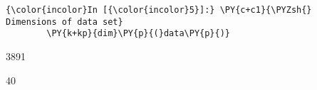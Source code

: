    \begin{Verbatim}[commandchars=\\\{\}]
{\color{incolor}In [{\color{incolor}5}]:} \PY{c+c1}{\PYZsh{} Dimensions of data set}
        \PY{k+kp}{dim}\PY{p}{(}data\PY{p}{)}
\end{Verbatim}


    \begin{enumerate*}
\item 3891
\item 40
\end{enumerate*}

